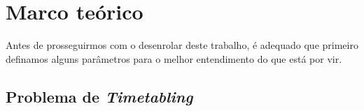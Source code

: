 \chapter{Marco teórico} \label{chap:marco}                                                              %

Antes de prosseguirmos com o desenrolar deste trabalho, é adequado que primeiro definamos alguns parâmetros para o melhor entendimento do que está por vir.




\section{Problema de \textit{Timetabling}} \label{sec:termos}                                                        %

